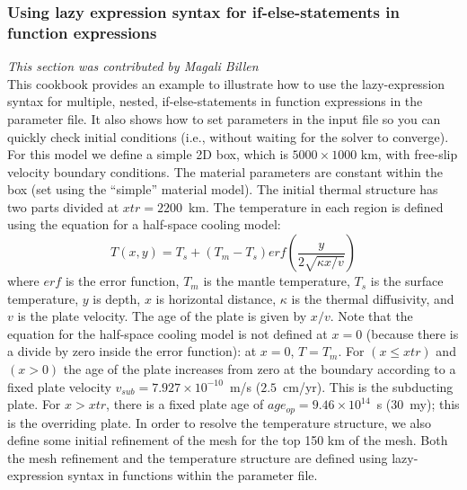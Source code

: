 \documentclass{article}
\begin{document}
\subsubsection{Using lazy expression syntax for if-else-statements in function expressions}
\label{sec:lazy-expression}
\textit{This section was contributed by Magali Billen}\\
This cookbook provides an example to illustrate how to use the lazy-expression syntax for multiple, nested, if-else-statements in function expressions in the parameter file. It also shows how to set parameters in the input file so you can quickly check initial conditions (i.e., without waiting for the solver to converge).  For this model we define a simple 2D box, which is $5000 \times 1000$ km, with free-slip velocity boundary conditions. The material parameters are constant within the box (set using the  ``simple'' material model). The initial thermal structure has two parts divided at $xtr=2200$~km. The temperature in each region is defined using the equation for a half-space cooling model:
\begin{equation}
T(x,y) = T_s + (T_m  - T_s) erf{(\frac{y}{2\sqrt{\kappa x/v}})}
\end{equation}
where $erf$ is the error function, $T_m$ is the mantle temperature, $T_s$ is the surface temperature, $y$ is depth, $x$ is horizontal distance, $\kappa$ is the thermal diffusivity, and $v$ is the plate velocity. The age of the plate is given by $x/v$. Note that the equation for the half-space cooling model is not defined at $x=0$ (because there is a divide by zero inside the error function): at $x=0$, $T=T_m$.  For $(x \le xtr)$ and $(x>0)$ the age of the plate increases from zero at the boundary according to a fixed plate velocity $v_{sub}=7.927\times10^{-10}$~m/s  ($2.5$~cm/yr). This is the subducting plate. For $x > xtr$, there is a fixed plate age of $age_{op}=9.46\times10^{14}$~s ($30$~my); this is the overriding plate. In order to resolve the temperature structure, we also define some initial refinement of the mesh for the top 150 km of the mesh. Both the mesh refinement and the temperature structure are defined using lazy-expression syntax in functions within the parameter file.
\end{document}
